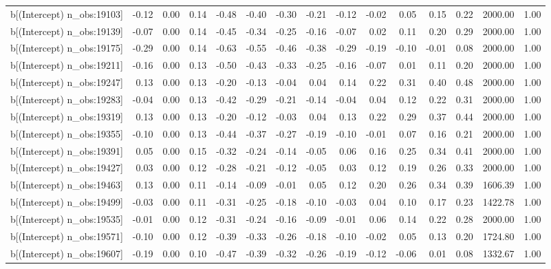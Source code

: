 \begin{table}[ht]
\begin{tabular}{rrrrrrrrrrrrrrr}
  b[(Intercept) n\_obs:19103] & -0.12 & 0.00 & 0.14 & -0.48 & -0.40 & -0.30 & -0.21 & -0.12 & -0.02 & 0.05 & 0.15 & 0.22 & 2000.00 & 1.00 \\ 
  b[(Intercept) n\_obs:19139] & -0.07 & 0.00 & 0.14 & -0.45 & -0.34 & -0.25 & -0.16 & -0.07 & 0.02 & 0.11 & 0.20 & 0.29 & 2000.00 & 1.00 \\ 
  b[(Intercept) n\_obs:19175] & -0.29 & 0.00 & 0.14 & -0.63 & -0.55 & -0.46 & -0.38 & -0.29 & -0.19 & -0.10 & -0.01 & 0.08 & 2000.00 & 1.00 \\ 
  b[(Intercept) n\_obs:19211] & -0.16 & 0.00 & 0.13 & -0.50 & -0.43 & -0.33 & -0.25 & -0.16 & -0.07 & 0.01 & 0.11 & 0.20 & 2000.00 & 1.00 \\ 
  b[(Intercept) n\_obs:19247] & 0.13 & 0.00 & 0.13 & -0.20 & -0.13 & -0.04 & 0.04 & 0.14 & 0.22 & 0.31 & 0.40 & 0.48 & 2000.00 & 1.00 \\ 
  b[(Intercept) n\_obs:19283] & -0.04 & 0.00 & 0.13 & -0.42 & -0.29 & -0.21 & -0.14 & -0.04 & 0.04 & 0.12 & 0.22 & 0.31 & 2000.00 & 1.00 \\ 
  b[(Intercept) n\_obs:19319] & 0.13 & 0.00 & 0.13 & -0.20 & -0.12 & -0.03 & 0.04 & 0.13 & 0.22 & 0.29 & 0.37 & 0.44 & 2000.00 & 1.00 \\ 
  b[(Intercept) n\_obs:19355] & -0.10 & 0.00 & 0.13 & -0.44 & -0.37 & -0.27 & -0.19 & -0.10 & -0.01 & 0.07 & 0.16 & 0.21 & 2000.00 & 1.00 \\ 
  b[(Intercept) n\_obs:19391] & 0.05 & 0.00 & 0.15 & -0.32 & -0.24 & -0.14 & -0.05 & 0.06 & 0.16 & 0.25 & 0.34 & 0.41 & 2000.00 & 1.00 \\ 
  b[(Intercept) n\_obs:19427] & 0.03 & 0.00 & 0.12 & -0.28 & -0.21 & -0.12 & -0.05 & 0.03 & 0.12 & 0.19 & 0.26 & 0.33 & 2000.00 & 1.00 \\ 
  b[(Intercept) n\_obs:19463] & 0.13 & 0.00 & 0.11 & -0.14 & -0.09 & -0.01 & 0.05 & 0.12 & 0.20 & 0.26 & 0.34 & 0.39 & 1606.39 & 1.00 \\ 
  b[(Intercept) n\_obs:19499] & -0.03 & 0.00 & 0.11 & -0.31 & -0.25 & -0.18 & -0.10 & -0.03 & 0.04 & 0.10 & 0.17 & 0.23 & 1422.78 & 1.00 \\ 
  b[(Intercept) n\_obs:19535] & -0.01 & 0.00 & 0.12 & -0.31 & -0.24 & -0.16 & -0.09 & -0.01 & 0.06 & 0.14 & 0.22 & 0.28 & 2000.00 & 1.00 \\ 
  b[(Intercept) n\_obs:19571] & -0.10 & 0.00 & 0.12 & -0.39 & -0.33 & -0.26 & -0.18 & -0.10 & -0.02 & 0.05 & 0.13 & 0.20 & 1724.80 & 1.00 \\ 
  b[(Intercept) n\_obs:19607] & -0.19 & 0.00 & 0.10 & -0.47 & -0.39 & -0.32 & -0.26 & -0.19 & -0.12 & -0.06 & 0.01 & 0.08 & 1332.67 & 1.00 \\ 

\end{tabular}
\end{table}
